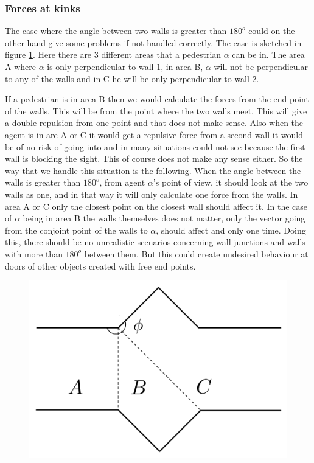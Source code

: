 \subsubsection{Forces at kinks}
The case where the angle between two walls is greater than $180^o$ could on the 
other hand give some problems if not handled correctly. The case is sketched in 
figure \ref{fig:wallcase}. Here there are 3 different areas that a pedestrian $\alpha$ 
can be in. The area A where $\alpha$ is only perpendicular to wall $1$, in area B, 
$\alpha$ will not be perpendicular to any of the walls and in C he will be only 
perpendicular to wall 2. 

If a pedestrian is in area B then we would calculate the 
forces from the end point of the walls. This will be from the point where the two 
walls meet. This will give a double repulsion from one point and that 
does not make sense. Also when the agent is in are A or C it would get a repulsive force 
from a second wall it would be of no risk of going into and in many situations 
could not see because the first wall is blocking the sight. This of course does not 
make any sense either. So the way that we handle this situation is the following. 
When the angle between the walls is greater than $180^o$, from agent $\alpha$'s 
point of view, it should look at the two walls as one, and in that way it will 
only calculate one force from the walls. In area A or C only the closest point 
on the closest wall should affect it. In the case of $\alpha$ being in area B 
the walls themselves does not matter, only the vector going from the conjoint 
point of the walls to $\alpha$, should affect and only one time. Doing this, 
there should be no unrealistic scenarios concerning wall junctions and walls 
with more than $180^o$ between them. But this could create undesired 
behaviour at doors of other objects created with free end points.

\begin{figure}[ht]
\centering
\includegraphics[scale=0.45]{Figures/WallCase.pdf} 
\caption{}\label{fig:wallcase}
\end{figure}

